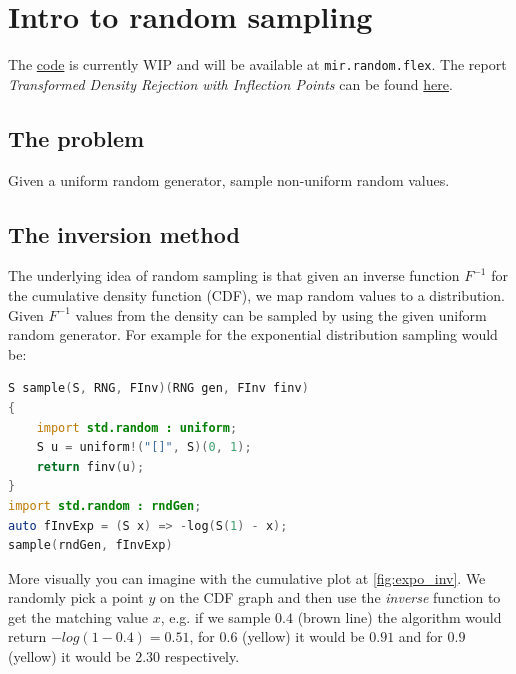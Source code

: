 \section{Intro to random sampling}

The \href{https://github.com/libmir/mir/pull/240}{code} is currently WIP and will be available at \texttt{mir.random.flex}. The report \textit{Transformed Density Rejection with Inflection Points} can be found  \href{http://epub.wu.ac.at/3158/1/techreport-110.pdf}{here}.

\subsection{The problem}

Given a uniform random generator, sample non-uniform random values.

\subsection{The inversion method}

The underlying idea of random sampling is that given an inverse function $F^{-1}$ for the cumulative density function (CDF), we map random values to a distribution. Given $F^{-1}$ values from the density can be sampled by using the given uniform random generator.
For example for the exponential distribution sampling would be:

\begin{lstlisting}[language=D]
S sample(S, RNG, FInv)(RNG gen, FInv finv)
{
    import std.random : uniform;
    S u = uniform!("[]", S)(0, 1);
    return finv(u);
}
import std.random : rndGen;
auto fInvExp = (S x) => -log(S(1) - x);
sample(rndGen, fInvExp)
\end{lstlisting}

More visually you can imagine with the cumulative plot at \autoref{fig:expo_inv}.
We randomly pick a point $y$ on the CDF graph and then use the \textit{inverse}
function to get the matching value $x$, e.g. if we sample $0.4$ (brown line) the algorithm
would return $-log(1 - 0.4) = 0.51$, for $0.6$ (yellow) it would be $0.91$ and for
$0.9$ (yellow) it would be $2.30$ respectively.

